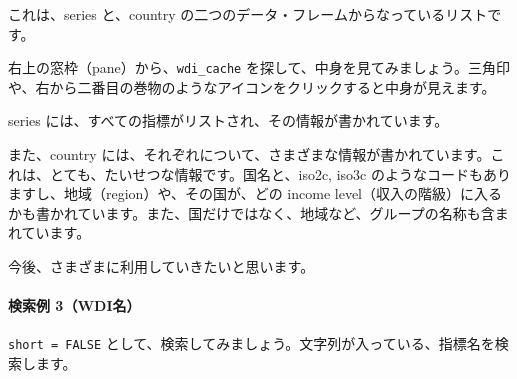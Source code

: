 \documentclass[
]{bxjsbook}
\theoremstyle{definition}
\theoremstyle{definition}
\theoremstyle{definition}
\theoremstyle{definition}
\theoremstyle{remark}
\begin{document}
これは、series と、country の二つのデータ・フレームからなっているリストです。

右上の窓枠（pane）から、\texttt{wdi\_cache} を探して、中身を見てみましょう。三角印や、右から二番目の巻物のようなアイコンをクリックすると中身が見えます。

series には、すべての指標がリストされ、その情報が書かれています。

また、country には、それぞれについて、さまざまな情報が書かれています。これは、とても、たいせつな情報です。国名と、iso2c, iso3c のようなコードもありますし、地域（region）や、その国が、どの income level（収入の階級）に入るかも書かれています。また、国だけではなく、地域など、グループの名称も含まれています。

今後、さまざまに利用していきたいと思います。

\hypertarget{ux691cux7d22ux4f8b-3wdiux540d}{%
\paragraph{検索例 3（WDI名）}\label{ux691cux7d22ux4f8b-3wdiux540d}}

\texttt{short\ =\ FALSE} として、検索してみましょう。文字列が入っている、指標名を検索します。
\end{document}
